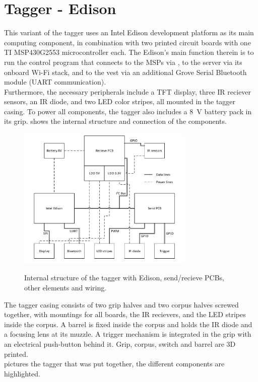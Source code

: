\chapter{Tagger - Edison}
This variant of the tagger uses an Intel Edison development platform as its main computing component, in combination with two printed circuit boards with one TI MSP430G2553 microcontroller each. The Edison's main function therein is to run the control program that connects to the MSPs via \isqc, to the server via its onboard Wi-Fi stack, and to the vest via an additional Grove Serial Bluetooth module (UART communication).\\
Furthermore, the necessary peripherals include a  TFT display, three IR reciever sensors, an IR diode, and two LED color stripes, all mounted in the tagger casing. To power all components, the tagger also includes a \SI{8}{\volt} battery pack in its grip.
 shows the internal structure and connection of the components.

\begin{figure}[h!]
\centering
\includegraphics[width=0.75\textwidth]{images/edison_tagger_struct.pdf}\\
\caption[Edison Tagger Structure]{Internal structure of the tagger with Edison, send/recieve PCBs, other elements and wiring.}
\label{fig:tag_ed_structure}
\end{figure}

The tagger casing consists of two grip halves and two corpus halves screwed together, with mountings for all boards, the IR recievers, and the LED stripes inside the corpus. A barrel is fixed inside the corpus and holds the IR diode and a focusing lens at its muzzle. A trigger mechanism is integrated in the grip with an electrical push-button behind it. Grip, corpus, switch and barrel are 3D printed.\\
 pictures the tagger that was put together, the different components are highlighted.

